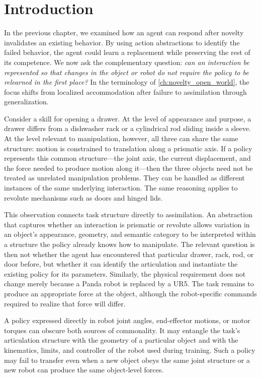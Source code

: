 \section{Introduction}
\label{sec:flex_motivation}

In the previous chapter, we examined how an agent can respond after novelty invalidates an existing behavior. By using action abstractions to identify the failed behavior, the agent could learn a replacement while preserving the rest of its competence. We now ask the complementary question: \emph{can an interaction be represented so that changes in the object or robot do not require the policy to be relearned in the first place?} In the terminology of \cref{ch:novelty_open_world}, the focus shifts from localized accommodation after failure to assimilation through generalization.

Consider a skill for opening a drawer. At the level of appearance and purpose, a drawer differs from a dishwasher rack or a cylindrical rod sliding inside a sleeve. At the level relevant to manipulation, however, all three can share the same structure: motion is constrained to translation along a prismatic axis. If a policy represents this common structure---the joint axis, the current displacement, and the force needed to produce motion along it---then the three objects need not be treated as unrelated manipulation problems. They can be handled as different instances of the same underlying interaction. The same reasoning applies to revolute mechanisms such as doors and hinged lids.

This observation connects task structure directly to assimilation. An abstraction that captures whether an interaction is prismatic or revolute allows variation in an object's appearance, geometry, and semantic category to be interpreted within a structure the policy already knows how to manipulate. The relevant question is then not whether the agent has encountered that particular drawer, rack, rod, or door before, but whether it can identify the articulation and instantiate the existing policy for its parameters. Similarly, the physical requirement does not change merely because a Panda robot is replaced by a UR5. The task remains to produce an appropriate force at the object, although the robot-specific commands required to realize that force will differ.

A policy expressed directly in robot joint angles, end-effector motions, or motor torques can obscure both sources of commonality. It may entangle the task's articulation structure with the geometry of a particular object and with the kinematics, limits, and controller of the robot used during training. Such a policy may fail to transfer even when a new object obeys the same joint structure or a new robot can produce the same object-level forces.

